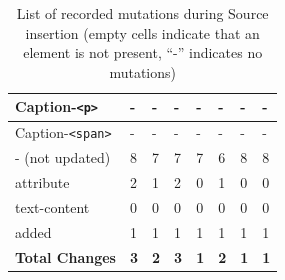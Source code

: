 \documentclass[a4paper, 12pt]{article}
\begin{document}
\begin{table}[!ht]
\begin{adjustbox}{angle=90}
\begin{tabular}{|l|l|l|l|l|l|l|l|}
      Caption-\verb|<p>|              & -                 & -               & -                   & -             & -               & -               & -               \\ \hline
      Caption-\verb|<span>|           & -                 & -               & -                   & -             & -               & -               & -               \\ \hline
      \hline
      - (not updated)                 & 8                 & 7               & 7                   & 7             & 6               & 8               & 8               \\ \hline
      \hline
      attribute                       & 2                 & 1               & 2                   & 0             & 1               & 0               & 0               \\ \hline
      text-content                    & 0                 & 0               & 0                   & 0             & 0               & 0               & 0               \\ \hline
      added                           & 1                 & 1               & 1                   & 1             & 1               & 1               & 1               \\ \hline
      \hline
      \textbf{Total Changes}          & \textbf{3}        & \textbf{2}      & \textbf{3}          & \textbf{1}    & \textbf{2}      & \textbf{1}      & \textbf{1}      \\ \hline
      \end{tabular}
  \end{adjustbox}
  \caption{List of recorded mutations during Source insertion (empty cells indicate that an element is not present, \enquote{-} indicates no mutations)}
  \label{tab:mutations:mediaSourceInsertion}
\end{table}
\end{document}
